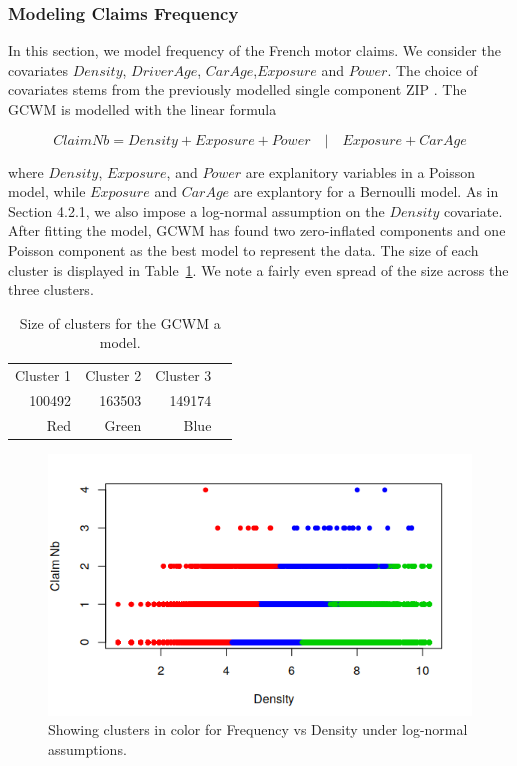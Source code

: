 \documentclass[11pt,letterpaper]{article}
\numberwithin{equation}{section}
\numberwithin{equation}{section}
\numberwithin{equation}{section}
\begin{document}
 \subsubsection{Modeling Claims Frequency}

In this section, we model frequency of the French motor claims. We consider the covariates $Density$, $DriverAge$, $CarAge$,$Exposure$ and $Power$. The choice of covariates stems from the previously modelled single component ZIP \citep{Charpentier:2014}.
The GCWM is modelled with the linear formula

\begin{equation}
Claim Nb = Density + Exposure + Power \quad|\quad Exposure + Car Age
\end{equation}

where $Density$, $Exposure$, and $Power$ are explanitory variables in a Poisson model, while $Exposure$ and $Car Age$ are explantory for a Bernoulli model. As in Section 4.2.1, we also impose a log-normal assumption on the $Density$ covariate.
After fitting the model, GCWM has found two zero-inflated components and one Poisson component as the best model to represent the data. The size of each cluster is displayed in Table~\ref{table:sizeFreq}. We note a fairly even spread of the size across the three clusters.

 \begin{table}[!htb]
\centering
\caption{Size of clusters for the GCWM a model.}
\label{table:sizeFreq}
\begin{tabular}{rrrr}
\hline\hline
Cluster 1   & Cluster 2  & Cluster 3   \\
100492 & 163503 & 149174 \\
Red & Green & Blue  \\
\hline\hline
\end{tabular}
\end{table}

\begin{figure}[!ht]
\begin{center}
\caption{Showing clusters in color for Frequency vs Density under log-normal assumptions.}
\label{frequencyGraph}
\includegraphics[scale=0.80]{frequency.png}
\end{center}
\end{figure}
\end{document}
